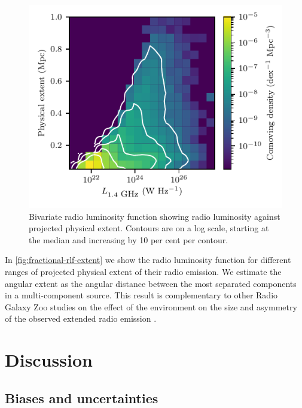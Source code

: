       \begin{figure}
          \centering
        \includegraphics{rlf-images/physical-extent.pdf}
        \caption[Bivariate radio luminosity function showing radio luminosity against projected physical extent.]{Bivariate radio luminosity function showing radio luminosity against projected physical extent. Contours are on a log scale, starting at the median and increasing by 10 per cent per contour.
        \label{fig:fractional-rlf-extent}}
      \end{figure}

      In \autoref{fig:fractional-rlf-extent} we show the radio luminosity
      function for different ranges of projected physical extent of their radio emission. We estimate the angular extent as the angular distance between the most separated components in a multi-component source. This result is complementary to other Radio Galaxy Zoo studies on the effect of the environment on the size and asymmetry of the observed extended radio emission \citep{rodman19asymmetry,garon19bending}.


\section{Discussion}\label{sec:rlfs-discussion}

  \subsection{Biases and uncertainties}
    \label{sec:rlfs-bias}

